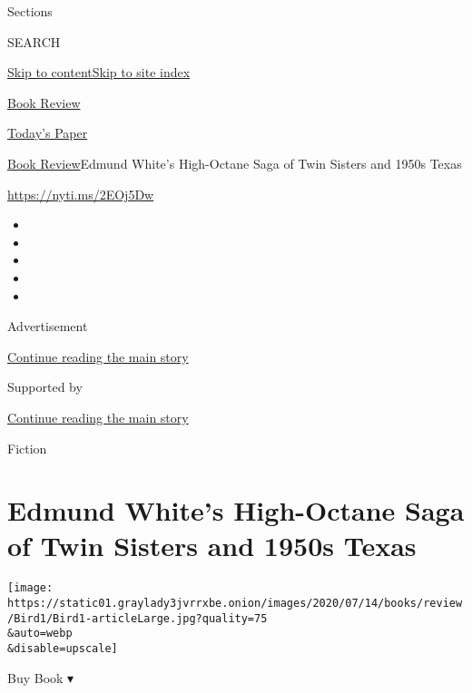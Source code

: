 Sections

SEARCH

\protect\hyperlink{site-content}{Skip to
content}\protect\hyperlink{site-index}{Skip to site index}

\href{https://www.nytimes3xbfgragh.onion/section/books/review}{Book
Review}

\href{https://myaccount.nytimes3xbfgragh.onion/auth/login?response_type=cookie\&client_id=vi}{}

\href{https://www.nytimes3xbfgragh.onion/section/todayspaper}{Today's
Paper}

\href{/section/books/review}{Book Review}\textbar{}Edmund White's
High-Octane Saga of Twin Sisters and 1950s Texas

\url{https://nyti.ms/2EOj5Dw}

\begin{itemize}
\item
\item
\item
\item
\item
\end{itemize}

Advertisement

\protect\hyperlink{after-top}{Continue reading the main story}

Supported by

\protect\hyperlink{after-sponsor}{Continue reading the main story}

Fiction

\hypertarget{edmund-whites-high-octane-saga-of-twin-sisters-and-1950s-texas}{%
\section{Edmund White's High-Octane Saga of Twin Sisters and 1950s
Texas}\label{edmund-whites-high-octane-saga-of-twin-sisters-and-1950s-texas}}

\texttt{[image: https://static01.graylady3jvrrxbe.onion/images/2020/07/14/books/review/Bird1/Bird1-articleLarge.jpg?quality=75\\\&auto=webp\\\&disable=upscale]}

Buy Book ▾

